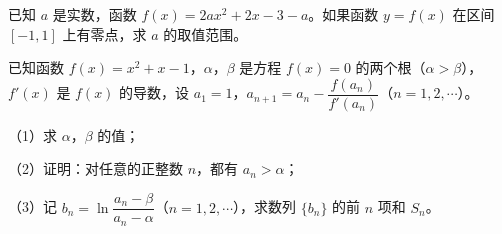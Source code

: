 \begin{question}
已知 $a$ 是实数，函数 $f(x)=2ax^2+2x-3-a$。如果函数 $y=f(x)$ 在区间 $[-1,1]$ 上有零点，求 $a$ 的取值范围。

\end{question}
\begin{question}
已知函数 $f(x)=x^2+x-1$，$\alpha$，$\beta$ 是方程 $f(x)=0$ 的两个根（$\alpha>\beta$），$f'(x)$ 是 $f(x)$ 的导数，设 $a_1=1$，$a_{n+1}=a_n-\dfrac{f(a_n)}{f'(a_n)}$（$n=1,2,\cdots$）。

（1）求 $\alpha$，$\beta$ 的值；

（2）证明：对任意的正整数 $n$，都有 $a_n>\alpha$；

（3）记 $b_n=\ln\dfrac{a_n-\beta}{a_n-\alpha}$（$n=1,2,\cdots$），求数列 $\{b_n\}$ 的前 $n$ 项和 $S_n$。

\end{question}